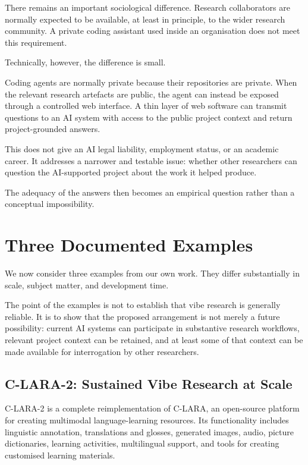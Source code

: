 There remains an important sociological difference. Research collaborators are normally expected to be available, at least in principle, to the wider research community. A private coding assistant used inside an organisation does not meet this requirement.

Technically, however, the difference is small.

Coding agents are normally private because their repositories are private. When the relevant research artefacts are public, the agent can instead be exposed through a controlled web interface. A thin layer of web software can transmit questions to an AI system with access to the public project context and return project-grounded answers.

This does not give an AI legal liability, employment status, or an academic career. It addresses a narrower and testable issue: whether other researchers can question the AI-supported project about the work it helped produce.

The adequacy of the answers then becomes an empirical question rather than a conceptual impossibility.


\section{Three Documented Examples}

We now consider three examples from our own work. They differ substantially in scale, subject matter, and development time.

The point of the examples is not to establish that vibe research is generally reliable. It is to show that the proposed arrangement is not merely a future possibility: current AI systems can participate in substantive research workflows, relevant project context can be retained, and at least some of that context can be made available for interrogation by other researchers.


\subsection{C-LARA-2: Sustained Vibe Research at Scale}

C-LARA-2 is a complete reimplementation of C-LARA, an open-source platform for creating multimodal language-learning resources. Its functionality includes linguistic annotation, translations and glosses, generated images, audio, picture dictionaries, learning activities, multilingual support, and tools for creating customised learning materials.

